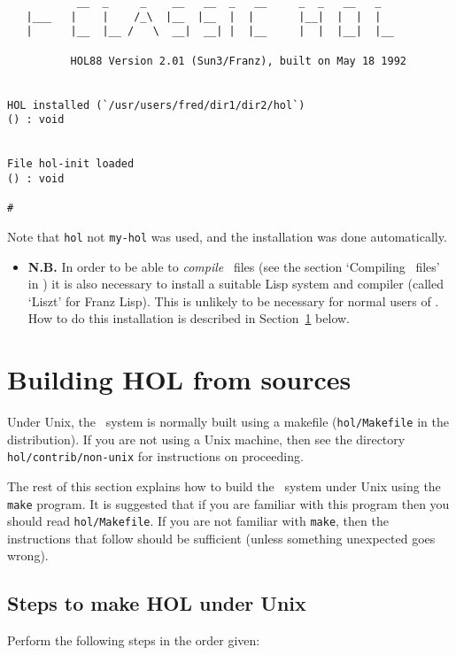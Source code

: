 {\begin{session}
\begin{verbatim}
           __  _     _    __   __  _   __     _  _   __   _
   |___   |    |    /_\  |__  |__  |  |       |__|  |  |  |
   |      |__  |__ /   \  __|  __| |  |__     |  |  |__|  |__

          HOL88 Version 2.01 (Sun3/Franz), built on May 18 1992


HOL installed (`/usr/users/fred/dir1/dir2/hol`)
() : void


File hol-init loaded
() : void

#
\end{verbatim}\end{session}

\noindent Note that {\small\tt hol} not {\small\tt my-hol} was used, and the
installation was done automatically.


\begin{itemize}
\item{\bf N.B.} In order to be able to
{\it compile\/} \ML\ files (see the section
`Compiling \ML\ files' in \DESCRIPTION) it is also necessary
to install a suitable Lisp system and compiler (called `Liszt' for Franz Lisp).
This is unlikely to be necessary for normal users of \HOL. How to do this
installation
is described in Section~\ref{build} below.
\end{itemize}

\section{Building HOL from sources}
\label{build}

Under Unix, the \HOL\ system is normally built using a makefile
({\small\tt hol/Makefile} in the distribution).
If you are not using a Unix machine, then see the directory
{\small\tt hol/contrib/non-unix} for instructions on proceeding.


The rest of  this section  explains how  to build  the \HOL\  system under Unix
using the {\small\tt make} program.  It is suggested  that if  you are familiar
with this program then you should  read {\small\tt  hol/Makefile}.   If you are
not familiar with {\small\tt make}, then the instructions that follow should be
sufficient (unless something unexpected goes wrong).

\subsection{Steps to make HOL under Unix}

Perform the following steps in the order given:

}
